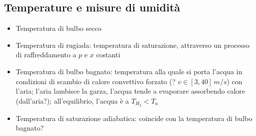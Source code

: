 \documentclass[letterpaper,10pt,italian]{jupyterBook}
\begin{document}
\subsection{Temperature e misure di umidità}
\label{\detokenize{ch/thermodynamics/humid-air:temperature-e-misure-di-umidita}}\begin{itemize}
\item {} 
\sphinxAtStartPar
Temperatura di bulbo secco

\item {} 
\sphinxAtStartPar
Temperatura di rugiada: temperatura di saturazione, attraverso un processo di raffreddamento a \(p\) e \(x\) costanti

\item {} 
\sphinxAtStartPar
Temperatura di bulbo bagnato: temperatura alla quale si porta l’acqua in condizioni di scambio di calore convettivo forzato (? \(v \in [3, 40] \, m/s\)) con l’aria; l’aria lambisce la garza, l’acqua tende a evaporare assorbendo calore (dall’aria?); all’equilibrio, l’acqua è a \(T_{H_2} < T_{a}\)

\item {} 
\sphinxAtStartPar
Temperatura di saturazione adiabatica: coincide con la temperatura di bulbo bagnato?

\end{itemize}
\end{document}
